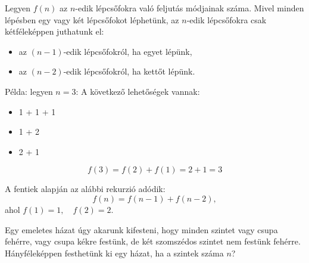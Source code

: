 \begin{solution}
Legyen $f(n)$ az $n$-edik lépcsőfokra való feljutás módjainak száma.
Mivel minden lépésben egy vagy két lépcsőfokot léphetünk, az $n$-edik
lépcsőfokra csak kétféleképpen juthatunk el: 
\begin{itemize}
\item az $(n-1)$-edik lépcsőfokról, ha egyet lépünk, 
\item az $(n-2)$-edik lépcsőfokról, ha kettőt lépünk. 
\end{itemize}
Példa: legyen $n=3$: A következő lehetőségek vannak: 
\begin{itemize}
\item 1 + 1 + 1 
\item 1 + 2 
\item 2 + 1 
\end{itemize}
\[
f(3)=f(2)+f(1)=2+1=3
\]

A fentiek alapján az alábbi rekurzió adódik: 
\[
f(n)=f(n-1)+f(n-2),
\]
ahol $f(1)=1,\quad f(2)=2$. 
\end{solution}
\begin{problem}
Egy emeletes házat úgy akarunk kifesteni, hogy minden szintet vagy
csupa fehérre, vagy csupa kékre festünk, de két szomszédos szintet
nem festünk fehérre. Hányféleképpen festhetünk ki egy házat, ha a
szintek száma $n$? 
\end{problem}

